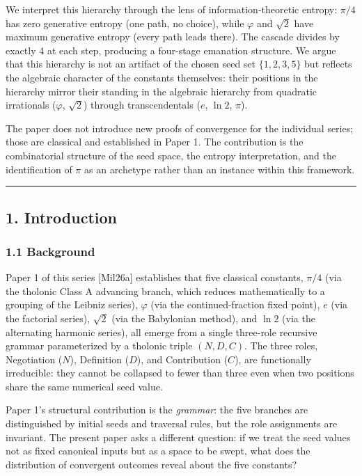 \documentclass[
  11pt,
  letterpaper,
]{article}
\begin{document}
We interpret this hierarchy through the lens of information-theoretic
entropy: \(\pi/4\) has zero generative entropy (one path, no choice),
while \(\varphi\) and \(\sqrt{2}\) have maximum generative entropy
(every path leads there). The cascade divides by exactly 4 at each step,
producing a four-stage emanation structure. We argue that this hierarchy
is not an artifact of the chosen seed set \(\{1, 2, 3, 5\}\) but
reflects the algebraic character of the constants themselves: their
positions in the hierarchy mirror their standing in the algebraic
hierarchy from quadratic irrationals (\(\varphi\), \(\sqrt{2}\)) through
transcendentals (\(e\), \(\ln 2\), \(\pi\)).

The paper does not introduce new proofs of convergence for the
individual series; those are classical and established in Paper 1. The
contribution is the combinatorial structure of the seed space, the
entropy interpretation, and the identification of \(\pi\) as an
archetype rather than an instance within this framework.

\begin{center}\rule{0.5\linewidth}{0.5pt}\end{center}

\subsection{1. Introduction}\label{introduction}

\subsubsection{1.1 Background}\label{background}

Paper 1 of this series {[}Mil26a{]} establishes that five classical
constants, \(\pi/4\) (via the tholonic Class A advancing branch, which
reduces mathematically to a grouping of the Leibniz series), \(\varphi\)
(via the continued-fraction fixed point), \(e\) (via the factorial
series), \(\sqrt{2}\) (via the Babylonian method), and \(\ln 2\) (via
the alternating harmonic series), all emerge from a single three-role
recursive grammar parameterized by a tholonic triple \((N, D, C)\). The
three roles, Negotiation (\(N\)), Definition (\(D\)), and Contribution
(\(C\)), are functionally irreducible: they cannot be collapsed to fewer
than three even when two positions share the same numerical seed value.

Paper 1's structural contribution is the \emph{grammar}: the five
branches are distinguished by initial seeds and traversal rules, but the
role assignments are invariant. The present paper asks a different
question: if we treat the seed values not as fixed canonical inputs but
as a space to be swept, what does the distribution of convergent
outcomes reveal about the five constants?
\end{document}
